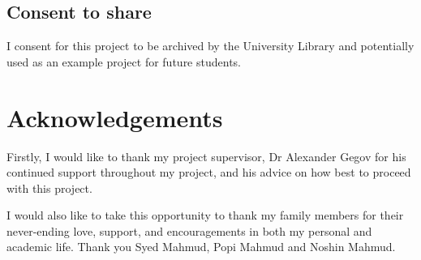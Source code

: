 \documentclass[12pt, a4paper]{report}
\begin{document}
\section*{Consent to share}
I consent for this project to be archived by the University Library and potentially used as an example project for future students.

\newpage
\renewcommand{\contentsname}{Table of Contents}	%
\tableofcontents

\newpage
{}	%
\listoftables

\newpage
{}	%
\listoffigures


\newpage

{}
\chapter*{Acknowledgements}
Firstly, I would like to thank my project supervisor, Dr Alexander Gegov for his continued support
throughout my project, and his advice on how best to proceed with this project.

I would also like to take this opportunity to thank my family members for their never-ending love,
support, and encouragements in both my personal and academic life.
Thank you Syed Mahmud, Popi Mahmud and Noshin Mahmud.
\newpage




%








% 
\end{document}
